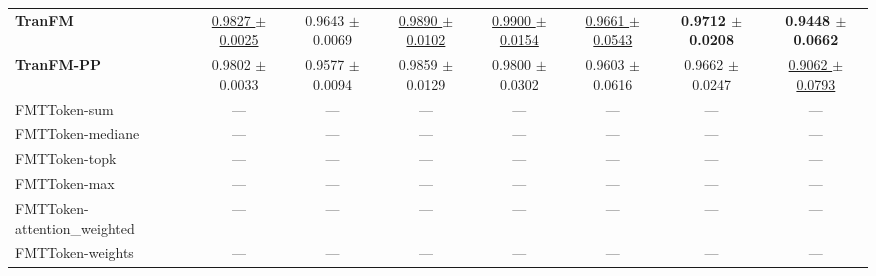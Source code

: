 \begin{table}[H]
{\begin{tabular}{lccccccc}
\textbf{TranFM} & \underline{0.9827 $\pm$ 0.0025} & 0.9643 $\pm$ 0.0069 & \underline{0.9890 $\pm$ 0.0102} & \underline{0.9900 $\pm$ 0.0154} & \underline{0.9661 $\pm$ 0.0543} & \textbf{0.9712 $\pm$ 0.0208} & \textbf{0.9448 $\pm$ 0.0662} \\
\textbf{TranFM-PP} & 0.9802 $\pm$ 0.0033 & 0.9577 $\pm$ 0.0094 & 0.9859 $\pm$ 0.0129 & 0.9800 $\pm$ 0.0302 & 0.9603 $\pm$ 0.0616 & 0.9662 $\pm$ 0.0247 & \underline{0.9062 $\pm$ 0.0793} \\
FMTToken-sum & — & — & — & — & — & — & — \\
FMTToken-mediane & — & — & — & — & — & — & — \\
FMTToken-topk & — & — & — & — & — & — & — \\
FMTToken-max & — & — & — & — & — & — & — \\
FMTToken-attention_weighted & — & — & — & — & — & — & — \\
FMTToken-weights & — & — & — & — & — & — & — \\
\bottomrule
\end{tabular}
}
\label{tab:reuters}
\end{table}

